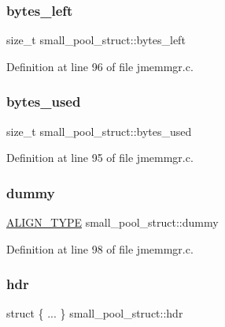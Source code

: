\subsubsection{\texorpdfstring{bytes\_left}{bytes\_left}}
{\footnotesize\ttfamily size\+\_\+t small\+\_\+pool\+\_\+struct\+::bytes\+\_\+left}



Definition at line 96 of file jmemmgr.\+c.

\mbox{\label{unionsmall__pool__struct_abe8273ffbd9403c060714752d28ef95f}} 
\subsubsection{\texorpdfstring{bytes\_used}{bytes\_used}}
{\footnotesize\ttfamily size\+\_\+t small\+\_\+pool\+\_\+struct\+::bytes\+\_\+used}



Definition at line 95 of file jmemmgr.\+c.

\mbox{\label{unionsmall__pool__struct_a73cdd7a86eb8b88c7e4e9ff91aee3f99}} 
\subsubsection{\texorpdfstring{dummy}{dummy}}
{\footnotesize\ttfamily \mbox{\hyperlink{jmemmgr_8c_a4781c052bb138f69ef6d60737fd569e3}{A\+L\+I\+G\+N\+\_\+\+T\+Y\+PE}} small\+\_\+pool\+\_\+struct\+::dummy}



Definition at line 98 of file jmemmgr.\+c.

\mbox{\label{unionsmall__pool__struct_aa49a2258b7552bf5ec0302434d862fbf}} 
\subsubsection{\texorpdfstring{hdr}{hdr}}
{\footnotesize\ttfamily struct \{ ... \}   small\+\_\+pool\+\_\+struct\+::hdr}

